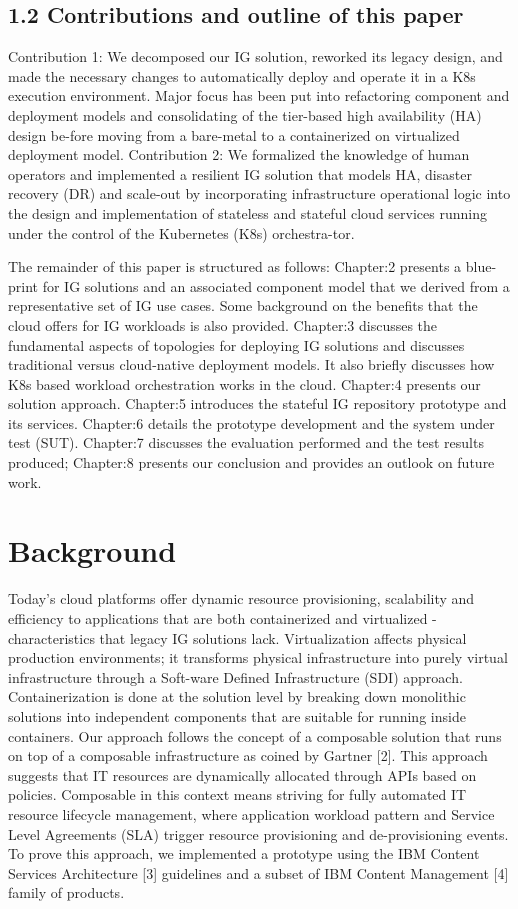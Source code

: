 \documentclass[runningheads]{llncs}
\begin{document}
\subsection{1.2	Contributions and outline of this paper}
Contribution 1: We decomposed our IG solution, reworked its legacy design, and made the necessary changes to automatically deploy and operate it in a K8s execution environment. Major focus has been put into refactoring component and deployment models and consolidating of the tier-based high availability (HA) design be-fore moving from a bare-metal to a containerized on virtualized deployment model. Contribution 2: We formalized the knowledge of human operators and implemented a resilient IG solution that models HA, disaster recovery (DR) and scale-out by incorporating infrastructure operational logic into the design and implementation of stateless and stateful cloud services running under the control of the Kubernetes (K8s) orchestra-tor.

The remainder of this paper is structured as follows: Chapter:2 presents a blue-print for IG solutions and an associated component model that we derived from a representative set of IG use cases. Some background on the benefits that the cloud offers for IG workloads is also provided. Chapter:3 discusses the fundamental aspects of topologies for deploying IG solutions and discusses traditional versus cloud-native deployment models. It also briefly discusses how K8s based workload orchestration works in the cloud. Chapter:4 presents our solution approach. Chapter:5 introduces the stateful IG repository prototype and its services. Chapter:6 details the prototype development and the system under test (SUT). Chapter:7 discusses the evaluation performed and the test results produced; Chapter:8 presents our conclusion and provides an outlook on future work.

\section{Background}
Today’s cloud platforms offer dynamic resource provisioning, scalability and efficiency to applications that are both containerized and virtualized - characteristics that legacy IG solutions lack. Virtualization affects physical production environments; it transforms physical infrastructure into purely virtual infrastructure through a Soft-ware Defined Infrastructure (SDI) approach. Containerization is done at the solution level by breaking down monolithic solutions into independent components that are suitable for running inside containers.
Our approach follows the concept of a composable solution that runs on top of a composable infrastructure as coined by Gartner [2]. This approach suggests that IT resources are dynamically allocated through APIs based on policies. Composable in this context means striving for fully automated IT resource lifecycle management, where application workload pattern and Service Level Agreements (SLA) trigger resource provisioning and de-provisioning events. To prove this approach, we implemented a prototype using the IBM Content Services Architecture [3] guidelines and a subset of IBM Content Management [4] family of products.
\end{document}
